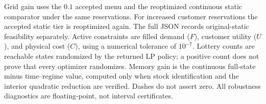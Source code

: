 Grid gain uses the $0.1$ accepted menu and the reoptimized continuous static comparator under the same reservations. For increased customer reservations the accepted static tier is reoptimized again. The full JSON records original-static feasibility separately. Active constraints are filled demand ($F$), customer utility ($U$), and physical cost ($C$), using a numerical tolerance of $10^{-7}$. Lottery counts are reachable states randomized by the returned LP policy; a positive count does not prove that every optimizer randomizes. Memory gain is the continuous full-state minus time--regime value, computed only when stock identification and the interior quadratic reduction are verified. Dashes do not assert zero. All robustness diagnostics are floating-point, not interval certificates.
